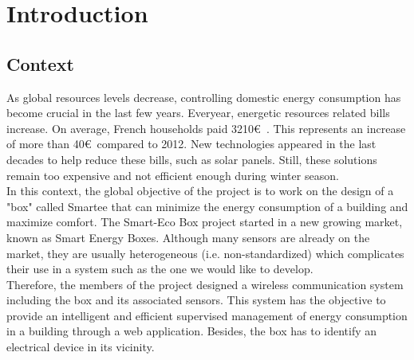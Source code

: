 %
%
\section{Introduction}

\subsection{Context}

As global resources levels decrease, controlling domestic energy consumption has become crucial in the last few years. Everyear, energetic resources related bills increase. On average, French households paid 3210\euro\ \cite{context}. This represents an increase of more than 40\euro\ compared to 2012. New technologies appeared in the last decades to help reduce these bills, such as solar panels. Still, these solutions remain too expensive and not efficient enough during winter season.\\


In this context, the global objective of the project is to work on the design of a "box" called Smartee that can minimize the energy consumption of a building and maximize comfort. The Smart-Eco Box project started in a new growing market, known as Smart Energy Boxes. Although many sensors are already on the market, they are usually heterogeneous (i.e. non-standardized) which complicates their use in a system such as the one we would like to develop.\\

Therefore, the members of the project designed a wireless communication system including the box and its associated sensors. This system has the objective to provide an intelligent and efficient supervised management of energy consumption in a building through a web application. Besides, the box has to identify an electrical device in its vicinity.\\

